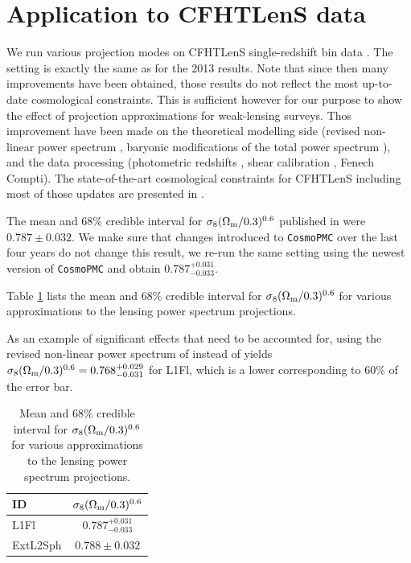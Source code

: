\documentclass[fleqn,usenatbib]{mnras} %
\begin{document}
\section{Application to CFHTLenS data}
\label{sec:cfhtlens}

We run various projection modes on CFHTLenS single-redshift bin data
\cite{CFHTLenS-2pt-notomo}. The setting is exactly the same as for the 2013
results. Note that since then many improvements have been obtained, those
results do not reflect the most up-to-date cosmological constraints. This is
sufficient however for our purpose to show the effect of projection
approximations for weak-lensing surveys. Thos improvement have been made on the
theoretical modelling side (revised non-linear power spectrum
\cite{2012ApJ...761..152T}, baryonic modifications of the total power spectrum
\cite{2015MNRAS.454.1958M}), and the data processing (photometric redshifts
\cite{2016MNRAS.463.3737C,joudaki/etal:2016}, shear calibration
\cite{KiDS-450}, Fenech Compti). The state-of-the-art cosmological constraints
for CFHTLenS including most of those updates are presented in
\cite{joudaki/etal:2016}.

The mean and 68\% credible interval for $\sigma_8 (\Omega_{\rm m}/0.3)^{0.6}$
published in \cite{CFHTLenS-2pt-notomo} were $0.787 \pm 0.032$. We make sure
that changes introduced to \texttt{CosmoPMC} over the last four years do not
change this result, we re-run the same setting using the newest version of
\texttt{CosmoPMC} and obtain $0.787^{+0.031}_{-0.033}$.

Table \ref{tab:CFHTLenS_Sigma8} lists the mean and 68\% credible interval for
$\sigma_8 (\Omega_{\rm m}/0.3)^{0.6}$ for various approximations to the lensing
power spectrum projections.

As an example of significant effects that need to be accounted for, using the
revised non-linear power spectrum of \cite{2012ApJ...761..152T} instead of
\cite{2003MNRAS.341.1311S} yields $\sigma_8 (\Omega_{\rm m}/0.3)^{0.6} =
0.768^{+0.029}_{-0.031}$ for L1Fl, which is a lower corresponding to 60\% of
the error bar.

\begin{table}

  \label{tab:CFHTLenS_Sigma8}

  \caption{Mean and 68\% credible interval for 
  $\sigma_8 (\Omega_{\rm m}/0.3)^{0.6}$ for various approximations to the lensing
  power spectrum projections.}

  \begin{tabular}{lc} \hline
  ID       & $\sigma_8 (\Omega_{\rm m}/0.3)^{0.6}$ \\ \hline
  L1Fl     & $0.787^{+0.031}_{-0.033}$ \\
  ExtL2Sph & $0.788 \pm 0.032$ \\ \hline
  \end{tabular}

\end{table}
\end{document}
